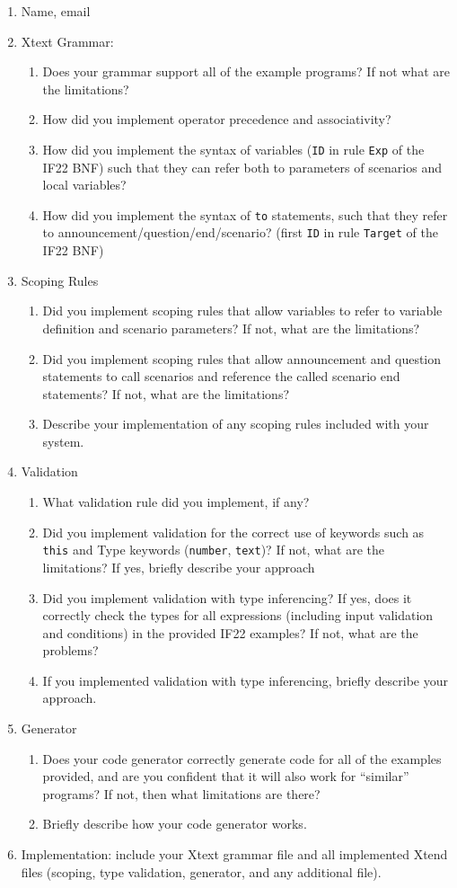\documentclass[12pt]{article}
\begin{document}
\begin{enumerate}
\item Name, email
\item Xtext Grammar:
  \begin{enumerate}
  \item Does your grammar support all of the example programs? If not
    what are the limitations?
  \item How did you implement operator precedence and associativity?
  \item How did you implement the syntax of variables ({\tt ID} in rule {\tt Exp} of the IF22 BNF) such that they can refer both to parameters of scenarios and local variables?
  \item How did you implement the syntax of \texttt{to} statements, such that they refer to announcement/question/end/scenario? (first {\tt ID} in rule {\tt Target} of the IF22 BNF)
  \end{enumerate}
\item Scoping Rules
  \begin{enumerate}
    \item Did you implement scoping rules that allow variables to refer to variable definition and scenario parameters? If not, what are the limitations?
    \item Did you implement scoping rules that allow announcement and question statements to call scenarios and reference the called scenario end statements? If not, what are the limitations?
    \item Describe your implementation of any scoping rules included with your system.
  \end{enumerate}
\item Validation
  \begin{enumerate}
  \item What validation rule did you implement, if any?
  \item Did you implement validation for the correct use of keywords such as \texttt{this} and Type keywords (\texttt{number}, \texttt{text})? If not, what are the limitations? If yes, briefly describe your approach
  \item Did you implement validation with type inferencing? If yes, does it correctly check the types for all expressions (including input validation and conditions) in the provided IF22 examples? If not, what are the problems?
  \item If you implemented validation with type inferencing, briefly describe your approach.
  \end{enumerate}
\item Generator
  \begin{enumerate}
  \item Does your code generator correctly generate code for all of the examples provided, and are you confident that it will also work for ``similar'' programs? If not, then what limitations are there?
  \item Briefly describe how your code generator works.
  \end{enumerate}
\item Implementation: include your Xtext grammar file and all implemented Xtend files (scoping, type validation, generator, and any additional file).
\end{enumerate}
\end{document}
